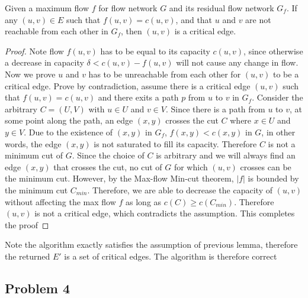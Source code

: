 \documentclass[11pt]{article}
\begin{document}
\begin{solution}
    \begin{lemma*}
        Given a maximum flow $f$ for flow network $G$ and its residual flow network $G_f$. If any $(u,v)\in E$ such that $f(u,v) = c(u,v)$, and that $u$ and $v$ are not reachable from each other in $G_f$, then $(u,v)$ is a critical edge. 
        \begin{proof}
            Note flow $f(u,v)$ has to be equal to its capacity $c(u,v)$, since otherwise a decrease in capacity $\delta < c(u,v) - f(u,v)$ will not cause any change in flow. Now we prove $u$ and $v$ has to be unreachable from each other for $(u,v)$ to be a critical edge. Prove by contradiction, assume there is a critical edge $(u,v)$ such that $f(u,v) = c(u,v)$ and there exits a path $p$ from $u$ to $v$ in $G_f$. Consider the arbitrary $C = (U,V)$ with $u\in U$ and $v\in V$. Since there is a path from $u$ to $v$, at some point along the path, an edge $(x,y)$ crosses the cut $C$ where $x\in U$ and $y\in V$. Due to the existence of $(x,y)$ in $G_f$, $f(x,y) < c(x,y)$ in $G$, in other words, the edge $(x,y)$ is not saturated to fill its capacity. Therefore $C$ is not a minimum cut of $G$. Since the choice of $C$ is arbitrary and we will always find an edge $(x,y)$ that crosses the cut, no cut of $G$ for which $(u,v)$ crosses can be the minimum cut. However, by the Max-flow Min-cut theorem, $|f|$ is bounded by the minimum cut $C_{min}$. Therefore, we are able to decrease the capacity of $(u,v)$ without affecting the max flow $f$ as long as $c(C) \geq c(C_{min})$. Therefore $(u,v)$ is not a critical edge, which contradicts the assumption. This completes the proof
        \end{proof}
    \end{lemma*}
   

   \begin{center}
        Note the algorithm exactly satisfies the assumption of previous lemma, therefore the returned $E'$ is a set of critical edges. The algorithm is therefore correct
   \end{center}

\end{solution}




\subsection*{Problem 4}
\end{document}
